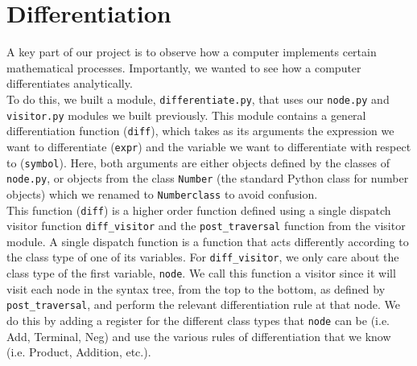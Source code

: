 \documentclass[12pt]{article}
\begin{document}


\section{Differentiation}
A key part of our project is to observe how a computer implements certain mathematical processes. Importantly, we wanted to see how a computer differentiates analytically. \\
To do this, we built a module, \texttt{differentiate.py}, that uses our \texttt{node.py} and \texttt{visitor.py} modules we built previously. This module contains a general differentiation function (\texttt{diff}), which takes as its arguments the expression we want to differentiate (\texttt{expr}) and the variable we want to differentiate with respect to (\texttt{symbol}). Here, both arguments are either objects defined by the classes of \texttt{node.py},
or objects from the class \texttt{Number} (the standard Python class for number objects) which we renamed to \texttt{Numberclass} to avoid confusion.\\
This function (\texttt{diff}) is a higher order function defined using a single dispatch visitor function \texttt{diff\_visitor} and the \texttt{post\_traversal} function from the visitor module.
A single dispatch function is a function that acts differently according to the class type of one of its variables. For \texttt{diff\_visitor}, we only care about the class type of the first variable, \texttt{node}.
We call this function a visitor since it will visit each node in the syntax tree, from the top to the bottom, as defined by \texttt{post\_traversal}, and perform the relevant differentiation rule at that node.
We do this by adding a register for the different class types that \texttt{node} can be (i.e. Add, Terminal, Neg) and use the various rules of differentiation that we know (i.e. Product, Addition, etc.). 
\end{document}
